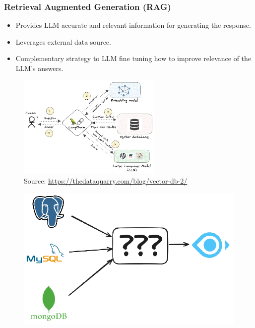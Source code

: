 \documentclass[10pt,utf8]{beamer}
\begin{document}
\begin{frame}
    \frametitle{Retrieval Augmented Generation (RAG)}
    \begin{itemize}
        \item Provides LLM accurate and relevant information for generating the response.
        \item Leverages external data source.
        \item Complementary strategy to LLM fine tuning how to improve relevance of the LLM's answers.
    \end{itemize}
    \begin{figure}
        \centering
        \includegraphics[height=5cm]{./img/rag.eps}
        \caption{\tiny{Source: \url{https://thedataquarry.com/blog/vector-db-2/}}}
    \end{figure}
\end{frame}

\begin{frame}
    \begin{figure}
        \centering
        \includegraphics[height=7cm]{./img/db_to_milvus.eps}
    \end{figure}
\end{frame}
\end{document}
